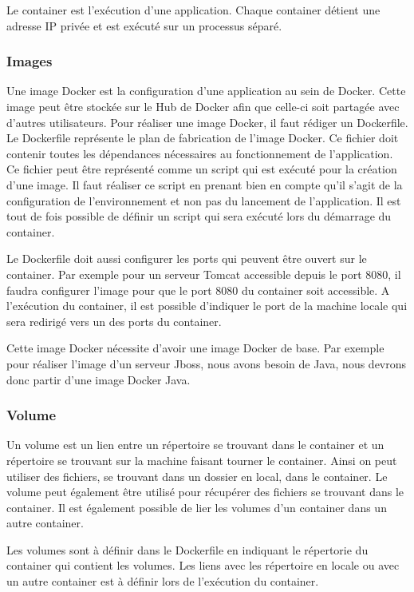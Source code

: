 Le container est l’exécution d'une application. Chaque container détient une adresse IP privée et est exécuté sur un processus séparé.


\subsubsection{Images}

Une image Docker est la configuration d'une application au sein de Docker. Cette image peut être stockée sur le Hub de Docker afin que celle-ci soit partagée avec d'autres utilisateurs. Pour réaliser une image Docker, il faut rédiger un Dockerfile. Le Dockerfile représente le plan de fabrication de l'image Docker. Ce fichier doit contenir toutes les dépendances nécessaires au fonctionnement de l'application. Ce fichier peut être représenté comme un script qui est exécuté pour la création d'une image. Il faut réaliser ce script en prenant bien en compte qu'il s'agit de la configuration de l'environnement et non pas du lancement de l'application. Il est tout de fois possible de définir un script qui sera exécuté lors du démarrage du container.

Le Dockerfile doit aussi configurer les ports qui peuvent être ouvert sur le container. Par exemple pour un serveur Tomcat accessible depuis le port 8080, il faudra configurer l'image pour que le port 8080 du container soit accessible. A l'exécution du container, il est possible d'indiquer le port de la machine locale qui sera redirigé vers un des ports du container. 

Cette image Docker nécessite d'avoir une image Docker de base. Par exemple pour réaliser l'image d'un serveur Jboss, nous avons besoin de Java, nous devrons donc partir d'une image Docker Java.


\subsubsection{Volume}

Un volume est un lien entre un répertoire se trouvant dans le container et un répertoire se trouvant sur la machine faisant tourner le container. Ainsi on peut utiliser des fichiers, se trouvant dans un dossier en local, dans le container. Le volume peut également être utilisé pour récupérer des fichiers se trouvant dans le container. Il est également possible de lier les volumes d'un container dans un autre container.

Les volumes sont à définir dans le Dockerfile en indiquant le répertorie du container qui contient les volumes. Les liens avec les répertoire en locale ou avec un autre container est à définir lors de l'exécution du container.

